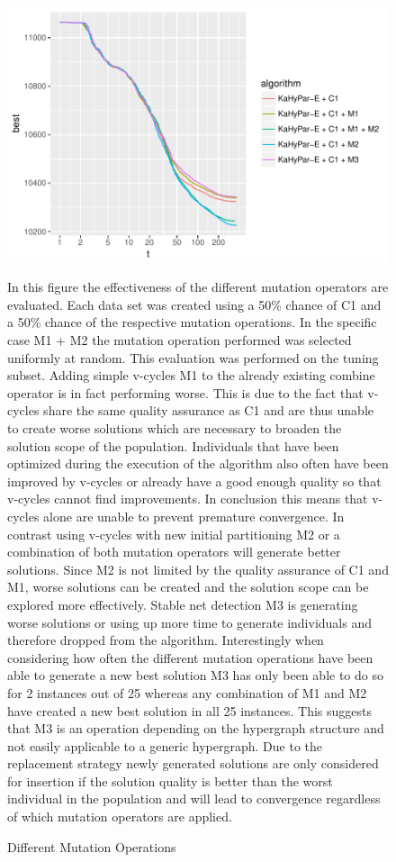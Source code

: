 \documentclass[a4paper,12pt,bibtotoc,titlepage, liststotoc,BCOR7mm,headsepline,pointlessnumbers]{scrbook}
\numberwithin{equation}{section}
\begin{document}
\begin{figure}[H]
\caption{Different Mutation Operations}
\begin{center}
\includegraphics{bachelorarbeit-differentoperatos}
\end{center}
In this figure the effectiveness of the different mutation operators are evaluated. Each data set was created using a 50\% chance of C1 and a 50\% chance of the respective mutation operations. In the specific case M1 + M2 the mutation operation performed was selected uniformly at random. This evaluation was performed on the tuning subset. Adding simple v-cycles M1 to the already existing combine operator is in fact performing worse. This is due to the fact that v-cycles share the same quality assurance as C1 and are thus unable to create worse solutions which are necessary to broaden the solution scope of the population. Individuals that have been optimized during the execution of the algorithm also often have been improved by v-cycles or already have a good enough quality so that v-cycles cannot find improvements. In conclusion this means that v-cycles alone are unable to prevent premature convergence. In contrast using v-cycles with new initial partitioning M2 or a combination of both mutation operators will generate better solutions. Since M2 is not limited by the quality assurance of C1 and M1, worse solutions can be created and the solution scope can be explored more effectively. Stable net detection M3 is generating worse solutions or using up more time to generate individuals and therefore dropped from the algorithm. Interestingly when considering how often the different mutation operations have been able to generate a new best solution M3 has only been able to do so for 2 instances out of 25 whereas any combination of M1 and M2 have created a new best solution in all 25 instances. This suggests that M3 is an operation depending on the hypergraph structure and not easily applicable to a generic hypergraph. Due to the replacement strategy newly generated solutions are only considered for insertion if the solution quality is better than the worst individual in the population and will lead to convergence regardless of which mutation operators are applied. 
\end{figure}
\end{document}
